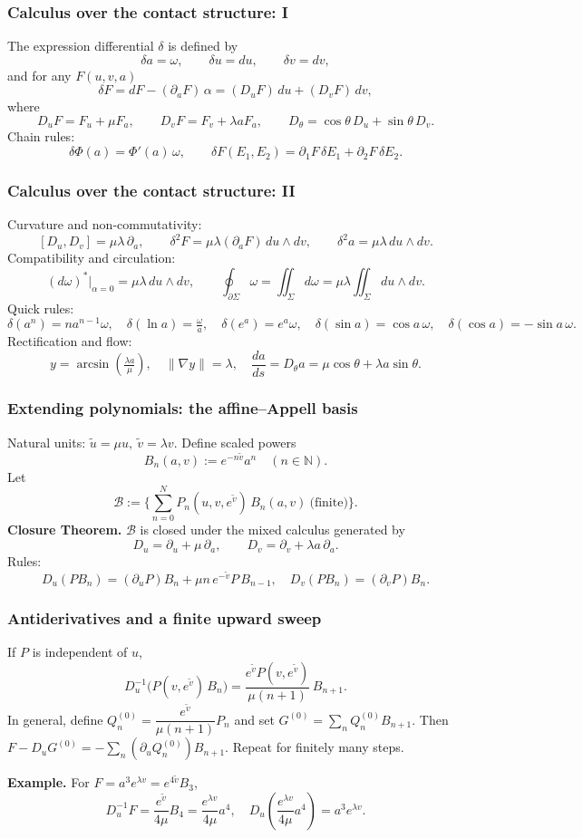 \documentclass[aspectratio=169]{beamer}
\begin{document}
\begin{frame}
    \frametitle{Calculus over the contact structure: I}
    The expression differential $\delta$ is defined by
    \[
      \delta a=\omega,\qquad \delta u=du,\qquad \delta v=dv,
    \]
    and for any $F(u,v,a)$
    \[
      \delta F = dF - (\partial_a F)\,\alpha
      = (D_uF)\,du + (D_vF)\,dv,
    \]
    where
    \[
      D_uF=F_u+\mu F_a,\qquad D_vF=F_v+\lambda a F_a,\qquad
      D_\theta=\cos\theta\,D_u+\sin\theta\,D_v.
    \]
    Chain rules:
    \[
      \delta\Phi(a)=\Phi'(a)\,\omega,\qquad
      \delta F(E_1,E_2)=\partial_1F\,\delta E_1+\partial_2F\,\delta E_2.
    \]
\end{frame}

\begin{frame}
    \frametitle{Calculus over the contact structure: II}
    Curvature and non-commutativity:
    \[
      [D_u,D_v]=\mu\lambda\,\partial_a,\qquad
      \delta^2F=\mu\lambda(\partial_a F)\,du\wedge dv,\qquad
      \delta^2 a=\mu\lambda\,du\wedge dv.
    \]
    Compatibility and circulation:
    \[
      (d\omega)^*\big|_{\alpha=0}=\mu\lambda\,du\wedge dv,\qquad
      \oint_{\partial\Sigma}\omega=\iint_\Sigma d\omega=\mu\lambda\iint_\Sigma du\wedge dv.
    \]
    Quick rules:
    \[
      \delta(a^n)=n a^{n-1}\omega,\quad
      \delta(\ln a)=\tfrac{\omega}{a},\quad
      \delta(e^a)=e^a\omega,\quad
      \delta(\sin a)=\cos a\,\omega,\quad
      \delta(\cos a)=-\sin a\,\omega.
    \]
    Rectification and flow:
    \[
      y=\arcsin\!\left(\tfrac{\lambda a}{\mu}\right),\quad \|\nabla y\|=\lambda,\quad
      \frac{da}{ds}=D_\theta a=\mu\cos\theta+\lambda a\sin\theta.
    \]
\end{frame}

\begin{frame}
  \frametitle{Extending polynomials: the affine–Appell basis}
  Natural units: $\tilde u=\mu u,\ \tilde v=\lambda v$. Define scaled powers
  \[
    B_n(a,v):=e^{-n\tilde v}a^n\quad(n\in\mathbb{N}).
  \]
  Let
  \[
    \mathcal{B}:=\Big\{\sum_{n=0}^N P_n(u,v,e^{\tilde v})\,B_n(a,v)\ \text{(finite)}\Big\}.
  \]
  \textbf{Closure Theorem.} $\mathcal{B}$ is closed under the mixed calculus generated by
  \[
    D_u=\partial_u+\mu\,\partial_a,\qquad D_v=\partial_v+\lambda a\,\partial_a.
  \]
  Rules:
  \[
    D_u(PB_n)=(\partial_u P)B_n+\mu n\,e^{-\tilde v}P\,B_{n-1},\quad
    D_v(PB_n)=(\partial_v P)B_n.
  \]
\end{frame}

\begin{frame}
  \frametitle{Antiderivatives and a finite upward sweep}
  If $P$ is independent of $u$,
  \[
    D_u^{-1}\!\big(P(v,e^{\tilde v})\,B_n\big)=\frac{e^{\tilde v}P(v,e^{\tilde v})}{\mu(n+1)}\,B_{n+1}.
  \]
  In general, define $Q^{(0)}_n=\dfrac{e^{\tilde v}}{\mu(n+1)}P_n$ and set $G^{(0)}=\sum_n Q^{(0)}_nB_{n+1}$.
  Then $F-\!D_uG^{(0)}=-\sum_n(\partial_uQ^{(0)}_n)B_{n+1}$. Repeat for finitely many steps.
  \vspace{0.6em}

  \textbf{Example.} For $F=a^3e^{\lambda v}=e^{4\tilde v}B_3$,
  \[
    D_u^{-1}F=\frac{e^{\tilde v}}{4\mu}B_4=\frac{e^{\lambda v}}{4\mu}a^4,\quad
    D_u\!\left(\frac{e^{\lambda v}}{4\mu}a^4\right)=a^3e^{\lambda v}.
  \]
\end{frame}
\end{document}
